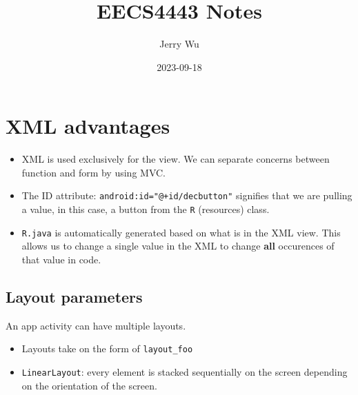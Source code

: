 \documentclass[12pt]{book}
\title{EECS4443 Notes}
\author{Jerry Wu}
\date{2023-09-18}
\begin{document}
\maketitle

\section*{XML advantages}

\begin{itemize}
    \item XML is used exclusively for the view. We can separate concerns between function and form by using MVC.
    \item The ID attribute: \texttt{android:id="@+id/decbutton"} signifies that we are pulling a value, in this case, a button from the \texttt{R} (resources) class. 
    \item \texttt{R.java} is automatically generated based on what is in the XML view. This allows us to change a single value in the XML to change \textbf{all} occurences of that value in code.
\end{itemize}

\subsection*{Layout parameters}
An app activity can have multiple layouts.
\begin{itemize}
  \item Layouts take on the form of \texttt{layout\_foo}
  \item \texttt{LinearLayout}: every element is stacked sequentially on the screen depending on the orientation of the screen.
\end{itemize}
\end{document}
